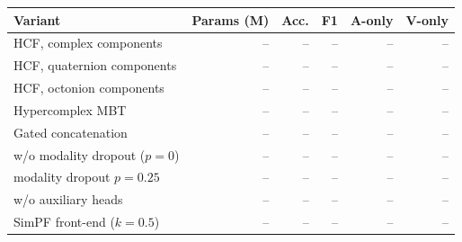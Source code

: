 \begin{tabular}{lrrrrr}
\toprule
Variant & Params (M) & Acc. & F1 & A-only & V-only \\
\midrule
HCF, complex components & -- & -- & -- & -- & -- \\
HCF, quaternion components & -- & -- & -- & -- & -- \\
HCF, octonion components & -- & -- & -- & -- & -- \\
Hypercomplex MBT & -- & -- & -- & -- & -- \\
Gated concatenation & -- & -- & -- & -- & -- \\
\midrule
w/o modality dropout ($p{=}0$) & -- & -- & -- & -- & -- \\
modality dropout $p{=}0.25$ & -- & -- & -- & -- & -- \\
w/o auxiliary heads & -- & -- & -- & -- & -- \\
\midrule
SimPF front-end ($k{=}0.5$) & -- & -- & -- & -- & -- \\
\bottomrule
\end{tabular}
